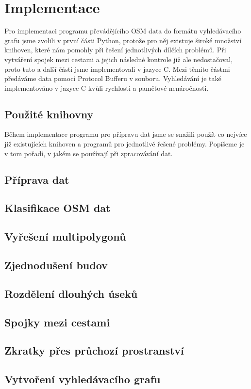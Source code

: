 \chapter{Implementace}
Pro implementaci programu převádějícího OSM data do formátu vyhledávacího grafu
jsme zvolili v první části Python, protože pro něj existuje široké množství
knihoven, které nám pomohly při řešení jednotlivých dílčích problémů. Při
vytváření spojek mezi cestami a jejich následné kontrole již ale nedostačoval,
proto tuto a další části jsme implementovali v jazyce C. Mezi těmito částmi
předáváme data pomocí Protocol Bufferu v souboru. Vyhledávání je také
implementováno v jazyce C kvůli rychlosti a paměťové nenáročnosti.

\section{Použité knihovny}
Během implementace programu pro přípravu dat jsme se snažili použít co nejvíce
již existujících knihoven a programů pro jednotlivé řešené problémy. Popíšeme je
v tom pořadí, v jakém se používají při zpracovávání dat. 
\section{Příprava dat}
\section{Klasifikace OSM dat}
\section{Vyřešení multipolygonů}
\section{Zjednodušení budov}
\section{Rozdělení dlouhých úseků}
\section{Spojky mezi cestami}
\section{Zkratky přes průchozí prostranství}
\section{Vytvoření vyhledávacího grafu}
